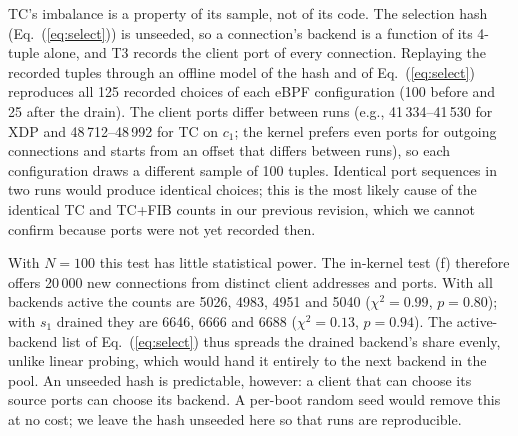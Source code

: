 \documentclass[conference]{IEEEtran}
\begin{document}
TC's imbalance is a property of its sample, not of its code. The selection
hash (Eq.~(\ref{eq:select})) is unseeded, so a connection's backend is a
function of its 4-tuple alone, and T3 records the client port of every
connection. Replaying the recorded tuples through an offline model of the
hash and of Eq.~(\ref{eq:select}) reproduces all 125 recorded choices of
each eBPF configuration (100 before and 25 after the drain). The client ports
differ between runs (e.g., 41\,334--41\,530 for XDP and 48\,712--48\,992 for TC
on $c_1$; the kernel prefers even ports for outgoing connections and starts
from an offset that differs between runs), so each configuration draws a
different sample of 100 tuples. Identical port sequences in two runs would
produce identical choices; this is the most likely cause of the identical TC
and TC+FIB counts in our previous revision, which we cannot confirm because
ports were not yet recorded then.

With $N=100$ this test has little statistical power. The in-kernel test (f)
therefore offers 20\,000 new connections from distinct client addresses and
ports. With all backends active the counts are 5026, 4983, 4951 and 5040
($\chi^2=0.99$, $p=0.80$); with $s_1$ drained they are 6646, 6666 and 6688
($\chi^2=0.13$, $p=0.94$). The active-backend list of
Eq.~(\ref{eq:select}) thus spreads the drained backend's share evenly, unlike
linear probing, which would hand it entirely to the next backend in the pool.
An unseeded hash is predictable, however: a client that can choose its source
ports can choose its backend. A per-boot random seed would remove this at no
cost; we leave the hash unseeded here so that runs are reproducible.
\end{document}

